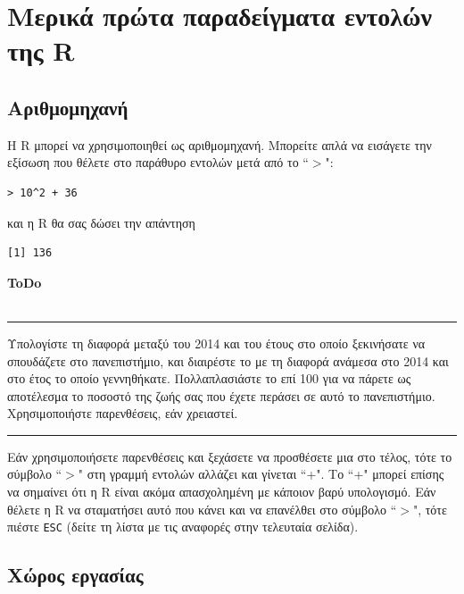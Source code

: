 \documentclass[a4paper,10pt,twocolumn]{article}
\newenvironment{ToDo} {
  \begin{flushright}
    \hfill
    \begin{minipage}{0.9\columnwidth}
    \textsf{\textbf{ToDo}} \\
      \vspace{-0.7cm}\\
      {\color{Gray}\rule[-0.05cm]{\columnwidth}{1.5pt}}} {
      {\color{Gray}\rule[0.3cm]{\columnwidth}{1.5pt}}
    \end{minipage}
    \vspace{0.3cm}
  \end{flushright}
  }
\begin{document}
\section{Μερικά πρώτα παραδείγματα εντολών της R}

\subsection{Αριθμομηχανή}

Η R μπορεί να χρησιμοποιηθεί ως αριθμομηχανή. Μπορείτε απλά να εισάγετε την εξίσωση που θέλετε στο
παράθυρο εντολών μετά από το ``$>$":

\begin{Verbatim}[frame=single,gobble=0]
> 10^2 + 36
\end{Verbatim}
και η R θα σας δώσει την απάντηση
\begin{Verbatim}[frame=single,gobble=0]
[1] 136
\end{Verbatim}

\begin{ToDo}
Υπολογίστε τη διαφορά μεταξύ του 2014 και του έτους στο οποίο ξεκινήσατε να σπουδάζετε στο πανεπιστήμιο,
και διαιρέστε το με τη διαφορά ανάμεσα στο 2014 και στο έτος το οποίο γεννηθήκατε. Πολλαπλασιάστε το επί 100 για
να πάρετε ως αποτέλεσμα το ποσοστό της ζωής σας που έχετε περάσει σε αυτό το πανεπιστήμιο. Χρησιμοποιήστε
παρενθέσεις, εάν χρειαστεί. \\
\end{ToDo}

Εάν χρησιμοποιήσετε παρενθέσεις και ξεχάσετε να προσθέσετε μια στο τέλος, τότε το σύμβολο ``$>$" στη γραμμή
εντολών αλλάζει και γίνεται ``+". Το ``+" μπορεί επίσης να σημαίνει ότι η R είναι ακόμα απασχολημένη με 
κάποιον βαρύ υπολογισμό. Εάν θέλετε η R να σταματήσει αυτό που κάνει και να επανέλθει στο σύμβολο ``$>$", 
τότε πιέστε \texttt{ESC} (δείτε τη λίστα με τις αναφορές στην τελευταία σελίδα). 

\subsection{Χώρος εργασίας}
\end{document}
